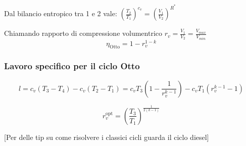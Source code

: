 Dal bilancio entropico tra 1 e 2 vale: $\left( \frac{T_2}{T_1} \right)^{c_v} = \left( \frac{V_1}{V_2} \right)^{R^*}$


Chiamando rapporto di compressione volumentrico $r_v = \frac{V_1}{V_2} = \frac{V_{max}}{V_{min}}$
\[
    \eta_{\text{Otto}} = 1 - r_v^{1-k}
\]

\subsubsection{Lavoro specifico per il ciclo Otto}

\[
    l = c_v(T_3-T_4) - c_v(T_2-T_1) = c_vT_3\left(1-\frac{1}{r_v^{k-1}}\right) - c_vT_1(r_v^{k-1}-1)
\]

\[
    r_v^{\text{opt}} = \left(\frac{T_3}{T_1}\right)^{\frac{1}{2(k-1)}}
\]

[Per delle tip su come risolvere i classici cicli guarda il ciclo diesel]